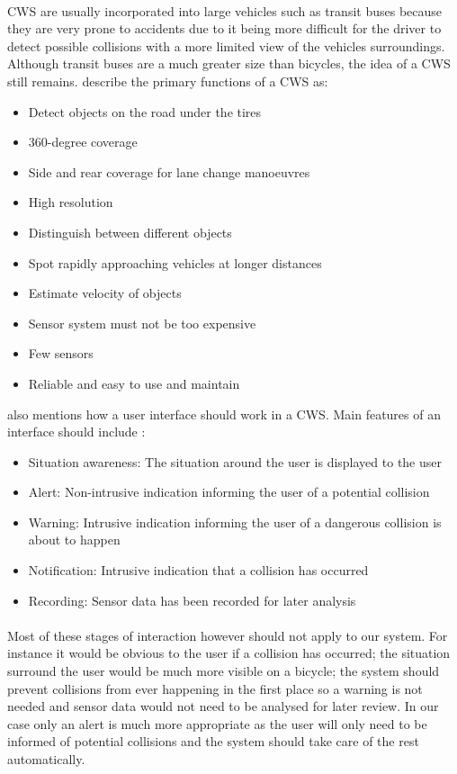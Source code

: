 \documentclass[a4paper]{report}
\begin{document}
\paragraph{}CWS are usually incorporated into large vehicles such as transit buses because they are very prone to accidents due to it being more difficult for the driver to detect possible collisions with a more limited view of the vehicles surroundings. Although transit buses are a much greater size than bicycles, the idea of a CWS still remains. \cite{CWS_transit_buses} describe the primary functions of a CWS as:
\begin{itemize}
\item Detect objects on the road under the tires
\item 360-degree coverage
\item Side and rear coverage for lane change manoeuvres 
\item High resolution
\item Distinguish between different objects
\item Spot rapidly approaching vehicles at longer distances
\item Estimate velocity of objects
\item Sensor system must not be too expensive
\item Few sensors
\item Reliable and easy to use and maintain
\end{itemize}

\cite{CWS_transit_buses} also mentions how a user interface should work in a CWS. Main features of an interface should include :

\begin{itemize}
\item Situation awareness: The situation around the user is displayed to the user
\item Alert: Non-intrusive indication informing the user of a potential collision
\item Warning: Intrusive indication informing the user of a dangerous collision is about to happen
\item Notification: Intrusive indication that a collision has occurred
\item Recording: Sensor data has been recorded for later analysis
\end{itemize}

\paragraph{}Most of these stages of interaction however should not apply to our system. For instance it would be obvious to the user if a collision has occurred; the situation surround the user would be much more visible on a bicycle; the system should prevent collisions from ever happening in the first place so a warning is not needed and sensor data would not need to be analysed for later review. In our case only an alert is much more appropriate as the user will only need to be informed of potential collisions and the system should take care of the rest automatically.
\end{document}
